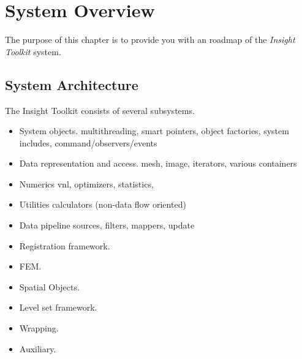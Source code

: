 \chapter{System Overview}
\label{chapter:SystemOverview}

The purpose of this chapter is to provide you with an roadmap of the
\emph{Insight Toolkit} system. 

\section{System Architecture}

The Insight Toolkit consists of several subsystems.

\begin{itemize}

	\item System objects.
	multithreading, smart pointers, object factories, system includes,
	command/observers/events

	\item Data representation and access.
	mesh, image, iterators, various containers

	\item Numerics
	vnl, optimizers, statistics, 

	\item Utilities
	calculators (non-data flow oriented)

	\item Data pipeline
	sources, filters, mappers, update

	\item Registration framework.

	\item FEM.

	\item Spatial Objects.

	\item Level set framework.

	\item Wrapping.

	\item Auxiliary.
	
\end{itemize}


